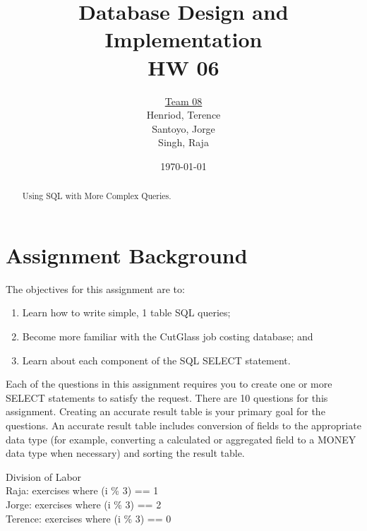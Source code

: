 \documentclass{article}
\title{Database Design and Implementation \\ HW 06}
\author{\underline{Team 08}\\Henriod, Terence\\Santoyo, Jorge\\Singh, Raja}
\date{\today}
\begin{document}
\clearpage
\maketitle
\thispagestyle{empty} %

\begin{abstract}
Using SQL with More Complex Queries.
\end{abstract}

\newpage
\section{Assignment Background}
The objectives for this assignment are to:
\begin{enumerate}
  \item Learn how to write simple, 1 table SQL queries;
  \item Become more familiar with the CutGlass job costing database; and
  \item Learn about each component of the SQL SELECT statement.
\end{enumerate}
Each of the questions in this assignment requires you to create one or more SELECT statements to satisfy the request. There are 10 questions for this assignment. Creating an accurate result table is your primary goal for the questions. An accurate result table includes conversion of fields to the appropriate data type (for example, converting a calculated or aggregated field to a MONEY data type when necessary) and sorting the result table.

Division of Labor\\
Raja: exercises where (i \% 3) == 1\\
Jorge: exercises where (i \% 3) == 2\\
Terence: exercises where (i \% 3) == 0\\

\newpage
\end{document}
